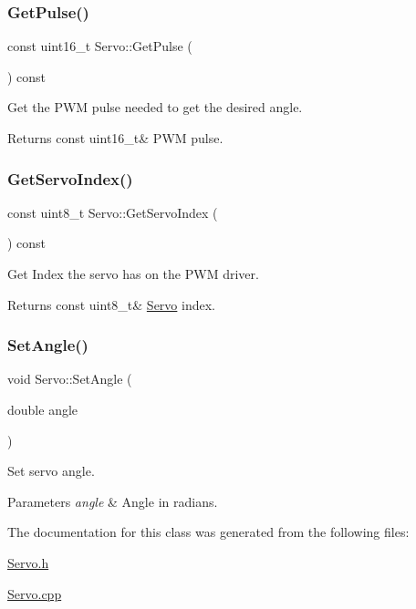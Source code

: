 \subsubsection{\texorpdfstring{GetPulse()}{GetPulse()}}
{\footnotesize\ttfamily const uint16\+\_\+t Servo\+::\+Get\+Pulse (\begin{DoxyParamCaption}{ }\end{DoxyParamCaption}) const}



Get the P\+WM pulse needed to get the desired angle. 

\begin{DoxyReturn}{Returns}
const uint16\+\_\+t\& P\+WM pulse. 
\end{DoxyReturn}
\mbox{\label{classServo_a1daacfe18f997f3d3dc1ea4d5d293e70}} 
\subsubsection{\texorpdfstring{GetServoIndex()}{GetServoIndex()}}
{\footnotesize\ttfamily const uint8\+\_\+t Servo\+::\+Get\+Servo\+Index (\begin{DoxyParamCaption}{ }\end{DoxyParamCaption}) const}



Get Index the servo has on the P\+WM driver. 

\begin{DoxyReturn}{Returns}
const uint8\+\_\+t\& \mbox{\hyperlink{classServo}{Servo}} index. 
\end{DoxyReturn}
\mbox{\label{classServo_af14dee8f2d30567768b12485b43111f2}} 
\subsubsection{\texorpdfstring{SetAngle()}{SetAngle()}}
{\footnotesize\ttfamily void Servo\+::\+Set\+Angle (\begin{DoxyParamCaption}\item[{double}]{angle }\end{DoxyParamCaption})}



Set servo angle. 


\begin{DoxyParams}{Parameters}
{\em angle} & Angle in radians. \\
\hline
\end{DoxyParams}


The documentation for this class was generated from the following files\+:\begin{DoxyCompactItemize}
\item 
\mbox{\hyperlink{Servo_8h}{Servo.\+h}}\item 
\mbox{\hyperlink{Servo_8cpp}{Servo.\+cpp}}\end{DoxyCompactItemize}
